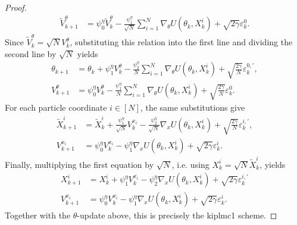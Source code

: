 \begin{proof}
\begin{align*}
\widetilde{V}^\theta_{k+1} &= \psi_0^\eta \widetilde{V}^\theta_k - \frac{\psi_1^\eta}{\sqrt{N}} \sum_{i=1}^N \nabla_\theta U(\theta_k, X_k^i) + \sqrt{2\gamma} \varepsilon^0_{k}.
\end{align*}
\normalsize
Since $\widetilde{V}_k^\theta=\sqrt{N}V_k^\theta$, substituting this relation into the first line and dividing the second line by $\sqrt{N}$ yields
\small
\begin{align*}
\theta_{k+1} &= \theta_k + \psi_1^\eta V^\theta_k - \frac{\psi_2^\eta}{N} \sum_{i=1}^N \nabla_\theta U(\theta_k, X_k^i)+ \sqrt{\frac{2\gamma}{N}} \varepsilon^{0,\prime}_{k},\\
V^\theta_{k+1} &= \psi_0^\eta V^\theta_k - \frac{\psi_1^\eta}{N} \sum_{i=1}^N \nabla_\theta U(\theta_k, X_k^i) + \sqrt{\frac{2\gamma}{N}} \varepsilon^0_{k}.
\end{align*}
\normalsize
For each particle coordinate $i\in[N]$, the same substitutions give
\small
\begin{align*}
\widetilde{X}_{k+1}^i &= \widetilde{X}_k^i + \frac{\psi_1^\eta}{\sqrt{N}}V^{x_i}_k - \frac{\psi_2^\eta}{\sqrt{N}} \nabla_x U(\theta_k, X_k^i)+ \sqrt{\frac{2\gamma}{N}} \varepsilon^{i,\prime}_{k},\\
V^{x_i}_{k+1} &= \psi_0^\eta V^{x_i}_k - \psi_1^\eta \nabla_x U(\theta_k, X_k^i) + \sqrt{2\gamma} \varepsilon^i_{k}.
\end{align*}
\normalsize
Finally, multiplying the first equation by $\sqrt{N}$, i.e. using $X_k^i=\sqrt{N}\widetilde{X}_k^i$, yields
\small
\begin{align*}
X^i_{k+1} &= X^i_k + \psi_1^\eta V^{x_i}_k - \psi_2^\eta \nabla_x U(\theta_k, X_k^i)+ \sqrt{2\gamma} \varepsilon^{i,\prime}_{k}\\
V^{x_i}_{k+1} &= \psi_0^\eta V^{x_i}_k - \psi_1^\eta \nabla_x U(\theta_k, X_k^i) + \sqrt{2\gamma} \varepsilon^i_{k}.
\end{align*}
\normalsize
Together with the $\theta$-update above, this is precisely the \gls*{kiplmc1} scheme.
\end{proof}

